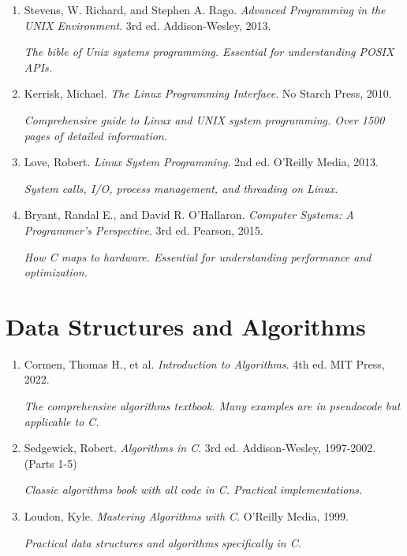 \documentclass[10pt,openany]{book}
\begin{document}
\begin{enumerate}
    \item Stevens, W. Richard, and Stephen A. Rago. \textit{Advanced Programming in the UNIX Environment}. 3rd ed. Addison-Wesley, 2013.

    \textit{The bible of Unix systems programming. Essential for understanding POSIX APIs.}

    \item Kerrisk, Michael. \textit{The Linux Programming Interface}. No Starch Press, 2010.

    \textit{Comprehensive guide to Linux and UNIX system programming. Over 1500 pages of detailed information.}

    \item Love, Robert. \textit{Linux System Programming}. 2nd ed. O'Reilly Media, 2013.

    \textit{System calls, I/O, process management, and threading on Linux.}

    \item Bryant, Randal E., and David R. O'Hallaron. \textit{Computer Systems: A Programmer's Perspective}. 3rd ed. Pearson, 2015.

    \textit{How C maps to hardware. Essential for understanding performance and optimization.}
\end{enumerate}

\section*{Data Structures and Algorithms}

\begin{enumerate}
    \item Cormen, Thomas H., et al. \textit{Introduction to Algorithms}. 4th ed. MIT Press, 2022.

    \textit{The comprehensive algorithms textbook. Many examples are in pseudocode but applicable to C.}

    \item Sedgewick, Robert. \textit{Algorithms in C}. 3rd ed. Addison-Wesley, 1997-2002. (Parts 1-5)

    \textit{Classic algorithms book with all code in C. Practical implementations.}

    \item Loudon, Kyle. \textit{Mastering Algorithms with C}. O'Reilly Media, 1999.

    \textit{Practical data structures and algorithms specifically in C.}
\end{enumerate}
\end{document}
